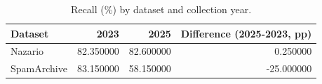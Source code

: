 \begin{table}[t]
\caption{Recall (\%) by dataset and collection year.}
\label{tab:dataset_year}
\begin{tabular}{lrrr}
\toprule
Dataset & 2023 & 2025 & Difference (2025-2023, pp) \\
\midrule
Nazario & 82.350000 & 82.600000 & 0.250000 \\
SpamArchive & 83.150000 & 58.150000 & -25.000000 \\
\bottomrule
\end{tabular}
\end{table}
